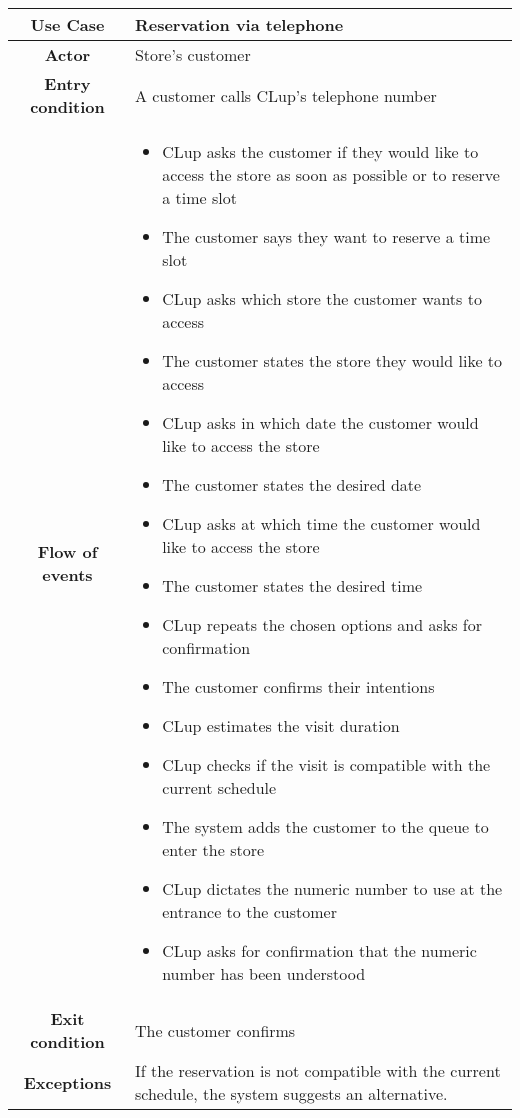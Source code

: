 \documentclass[../../main.tex]{subfiles}
\begin{document}
    \begin{table}[H]
      \centering
        \begin{tabular}{c m{}}
        \hline
        \textbf{Use Case} & Reservation via telephone\\ \hline
        \textbf{Actor} & Store's customer\\ \hline
        \textbf{Entry condition} & A customer calls CLup's telephone number\\  \hline
        \textbf{Flow of events} & \begin{itemize}
                                    \item CLup asks the customer if they would like to access the store as soon as possible or to reserve a time slot
                                    \item The customer says they want to reserve a time slot
                                    \item CLup asks which store the customer wants to access
                                    \item The customer states the store they would like to access
                                    \item CLup asks in which date the customer would like to access the store
                                    \item The customer states the desired date
                                    \item CLup asks at which time the customer would like to access the store
                                    \item The customer states the desired time
                                    \item CLup repeats the chosen options and asks for confirmation
                                    \item The customer confirms their intentions
                                    \item CLup estimates the visit duration
                                    \item CLup checks if the visit is compatible with the current schedule
                                    \item The system adds the customer to the queue to enter the store
                                    \item CLup dictates the numeric number to use at the entrance to the customer
                                    \item CLup asks for confirmation that the numeric number has been understood
                                  \end{itemize}\\ \hline
        \textbf{Exit condition} & The customer confirms \\ \hline
        \textbf{Exceptions} & If the reservation is not compatible with the current schedule, the system suggests an alternative.
        

\end{tabular}
\end{table}
\end{document}
